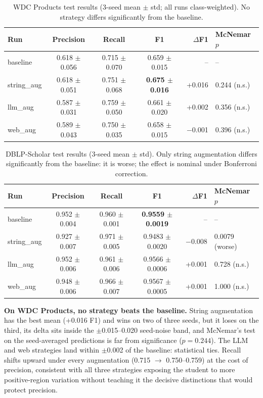\documentclass[a4paper,oneside,bibliography=totoc]{scrbook}
\begin{document}
\begin{table}[!htbp]
  \centering
  \small
  \setlength{\tabcolsep}{4pt}
  \begin{tabular}{lcccrl}
    \toprule
    \textbf{Run} & \textbf{Precision} & \textbf{Recall} & \textbf{F1} & \textbf{$\Delta$F1} & \textbf{McNemar $p$} \\
    \midrule
    baseline & 0.618 $\pm$ 0.056 & 0.715 $\pm$ 0.070 & 0.659 $\pm$ 0.015 & -- & -- \\
    string\_aug & 0.618 $\pm$ 0.051 & 0.751 $\pm$ 0.068 & \textbf{0.675 $\pm$ 0.016} & +0.016 & 0.244 (n.s.) \\
    llm\_aug & 0.587 $\pm$ 0.031 & 0.759 $\pm$ 0.050 & 0.661 $\pm$ 0.020 & +0.002 & 0.356 (n.s.) \\
    web\_aug & 0.589 $\pm$ 0.043 & 0.750 $\pm$ 0.035 & 0.658 $\pm$ 0.015 & $-$0.001 & 0.396 (n.s.) \\
    \bottomrule
  \end{tabular}
  \caption{WDC Products test results (3-seed mean $\pm$ std; all runs class-weighted). No strategy differs significantly from the baseline.}
  \label{tab:results_wdc}
\end{table}

\begin{table}[!htbp]
  \centering
  \small
  \setlength{\tabcolsep}{4pt}
  \begin{tabular}{lcccrl}
    \toprule
    \textbf{Run} & \textbf{Precision} & \textbf{Recall} & \textbf{F1} & \textbf{$\Delta$F1} & \textbf{McNemar $p$} \\
    \midrule
    baseline & 0.952 $\pm$ 0.004 & 0.960 $\pm$ 0.001 & \textbf{0.9559 $\pm$ 0.0019} & -- & -- \\
    string\_aug & 0.927 $\pm$ 0.007 & 0.971 $\pm$ 0.005 & 0.9483 $\pm$ 0.0020 & $-$0.008 & 0.0079 (worse) \\
    llm\_aug & 0.952 $\pm$ 0.006 & 0.961 $\pm$ 0.006 & 0.9566 $\pm$ 0.0006 & +0.001 & 0.728 (n.s.) \\
    web\_aug & 0.948 $\pm$ 0.006 & 0.966 $\pm$ 0.007 & 0.9567 $\pm$ 0.0005 & +0.001 & 1.000 (n.s.) \\
    \bottomrule
  \end{tabular}
  \caption{DBLP-Scholar test results (3-seed mean $\pm$ std). Only string augmentation differs significantly from the baseline: it is worse; the effect is nominal under Bonferroni correction.}
  \label{tab:results_dblp}
\end{table}

\textbf{On WDC Products, no strategy beats the baseline.} String augmentation has the best mean (+0.016 F1) and wins on two of three seeds, but it loses on the third, its delta sits inside the $\pm$0.015--0.020 seed-noise band, and McNemar's test on the seed-averaged predictions is far from significance ($p = 0.244$). The LLM and web strategies land within $\pm$0.002 of the baseline: statistical ties. Recall shifts upward under every augmentation (0.715 $\rightarrow$ 0.750--0.759) at the cost of precision, consistent with all three strategies exposing the student to more positive-region variation without teaching it the decisive distinctions that would protect precision.
\end{document}
